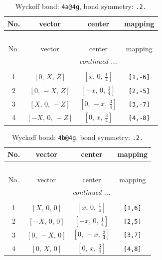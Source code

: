 \documentclass[fleqn,8pt]{jsarticle}
\begin{document}
\begin{longtable}{cccc}
\caption{Wyckoff bond: {\tt 4a@4g}, bond symmetry: {\tt .2.}}
 \\
 \hline \hline
No. & vector & center & mapping \\ \hline \endfirsthead

\multicolumn{3}{l}{\tablename\ \thetable{}} \\
 \hline \hline
No. & vector & center & mapping \\ \hline \endhead

 \hline \hline
\multicolumn{3}{r}{\footnotesize\it continued ...} \\ \endfoot

 \hline \hline
\multicolumn{3}{r}{} \\ \endlastfoot

1 & $\left[ 0,\, X,\, Z \right]$ & $\left[ x,\, 0,\, \frac{1}{4} \right]$ & {\tt [1,-6]} \\ \hline
2 & $\left[ 0,\, - X,\, Z \right]$ & $\left[ - x,\, 0,\, \frac{1}{4} \right]$ & {\tt [2,-5]} \\ \hline
3 & $\left[ X,\, 0,\, - Z \right]$ & $\left[ 0,\, - x,\, \frac{3}{4} \right]$ & {\tt [3,-7]} \\ \hline
4 & $\left[ - X,\, 0,\, - Z \right]$ & $\left[ 0,\, x,\, \frac{3}{4} \right]$ & {\tt [4,-8]} \\
\end{longtable}
\renewcommand{\arraystretch}{1.2}
\begin{longtable}{cccc}
\caption{Wyckoff bond: {\tt 4b@4g}, bond symmetry: {\tt .2.}}
 \\
 \hline \hline
No. & vector & center & mapping \\ \hline \endfirsthead

\multicolumn{3}{l}{\tablename\ \thetable{}} \\
 \hline \hline
No. & vector & center & mapping \\ \hline \endhead

 \hline \hline
\multicolumn{3}{r}{\footnotesize\it continued ...} \\ \endfoot

 \hline \hline
\multicolumn{3}{r}{} \\ \endlastfoot

1 & $\left[ X,\, 0,\, 0 \right]$ & $\left[ x,\, 0,\, \frac{1}{4} \right]$ & {\tt [1,6]} \\ \hline
2 & $\left[ - X,\, 0,\, 0 \right]$ & $\left[ - x,\, 0,\, \frac{1}{4} \right]$ & {\tt [2,5]} \\ \hline
3 & $\left[ 0,\, - X,\, 0 \right]$ & $\left[ 0,\, - x,\, \frac{3}{4} \right]$ & {\tt [3,7]} \\ \hline
4 & $\left[ 0,\, X,\, 0 \right]$ & $\left[ 0,\, x,\, \frac{3}{4} \right]$ & {\tt [4,8]} \\
\end{longtable}
\end{document}
